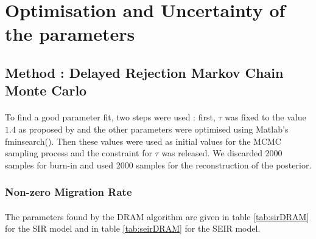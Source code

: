 \documentclass[11pt, a4paper]{article}
\begin{document}
\section{Optimisation and Uncertainty of the parameters}

\subsection{Method : Delayed Rejection Markov Chain Monte Carlo}
\paragraph{}
To find a good parameter fit, two steps were used : first, $\tau$ was fixed to the value $1.4$ as proposed by \cite{coelho2011bayesian} and the other parameters were optimised using Matlab's fminsearch(). Then these values were used as initial values for the MCMC sampling process and the constraint for $\tau$ was released. We discarded 2000 samples for burn-in and used 2000 samples for the reconstruction of the posterior.

\subsubsection{Non-zero Migration Rate}
\paragraph{}
The parameters found by the DRAM algorithm are given in table \ref{tab:sirDRAM} for the SIR model and in table \ref{tab:seirDRAM} for the SEIR model.
\end{document}
